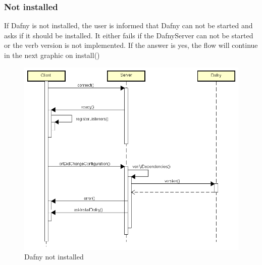 \subsubsection{Not installed}
If Dafny is not installed, the user is informed that Dafny can not be started and asks if it should be installed. It either fails if the DafnyServer can not be started or the verb version is not implemented. If the answer is yes, the flow will continue in the next graphic on install()
\begin{figure}[H]
	\centering
	\includegraphics[width=1\textwidth]{img/DafnyNotInstalled}
	\caption{Dafny not installed}
	\label{fig:Dafny not installed}
\end{figure}

